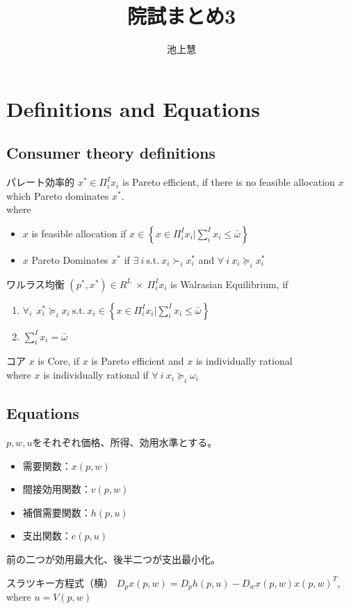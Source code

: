\documentclass{jsarticle}
\begin{document}
\title{院試まとめ3}
\author{池上慧}
\maketitle

\section{Definitions and Equations}
\subsection{Consumer theory definitions}
\begin{itembox}[l]{パレート効率的}
	$x^{*} \in \Pi_i^I x_i$ is Pareto efficient, if there is no feasible allocation $x$ which Pareto dominates $x^{*}$. \\
	where 
	\begin{itemize}
		\item $x$ is feasible allocation if $x \in \left\{ x \in \Pi_i^I x_i | \sum_i^I x_i \leq \bar{\omega} \right\}$
		\item $x$ Pareto Dominates $x^*$ if $\exists \ i\ \text{s.t.}\ x_i \succ_i x_i^*$ and $\forall \ i \ x_i \succeq_i x_i^*$
	\end{itemize}
\end{itembox}

\begin{itembox}[l]{ワルラス均衡}
	$(p^*, x^*) \in R^L\ \times \ \Pi_i^I x_i$ is Walrasian Equilibrium, if\\
	\begin{enumerate}
		\item $\forall_i \ \ x_i^* \succeq_i x_i\ \text{s.t.}\ x_i \in \left\{ x \in \Pi_i^I x_i | \sum_i^I x_i \leq \bar{\omega} \right\}$
		\item $\sum_i^I x_i = \bar{\omega}$
	\end{enumerate}
\end{itembox}

\begin{itembox}[l]{コア}
	$x$ is Core, if $x$ is Pareto efficient and $x$ is individually rational\\
	where $x$ is individually rational if $\forall  \ i \ x_i \succeq_i \omega_i$
\end{itembox}

\subsection{Equations}
$p,w,u$をそれぞれ価格、所得、効用水準とする。
\begin{itemize}
	\item 需要関数：$x(p, w)$
	\item 間接効用関数：$v(p, w)$
	\item 補償需要関数：$h(p, u)$
	\item 支出関数：$e(p, u)$
\end{itemize}
前の二つが効用最大化、後半二つが支出最小化。
\begin{itembox}[l]{スラツキー方程式（横）}
	$D_p x(p,w) = D_p h(p, u) - D_w x(p, w) x(p, w)^{T}$, where $u = V(p, w)$
\end{itembox}
\end{document}
